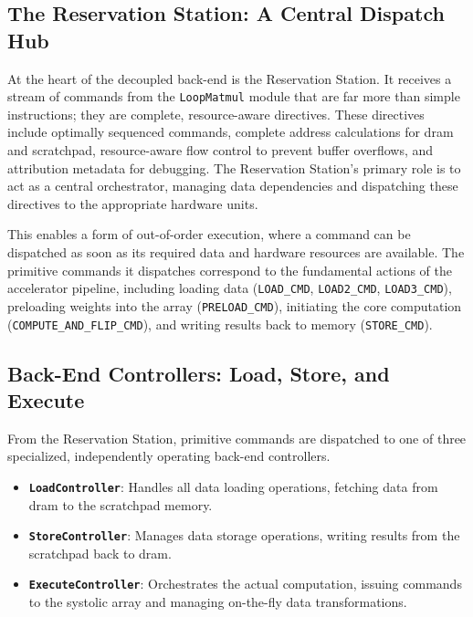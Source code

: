 \subsection{The Reservation Station: A Central Dispatch Hub}
\label{ssec:reservation_station}

At the heart of the decoupled back-end is the Reservation Station. It receives a stream of commands from the \texttt{LoopMatmul} module that are far more than simple instructions; they are complete, resource-aware directives. These directives include optimally sequenced commands, complete address calculations for \acrshort{dram} and scratchpad, resource-aware flow control to prevent buffer overflows, and attribution metadata for debugging. The Reservation Station's primary role is to act as a central orchestrator, managing data dependencies and dispatching these directives to the appropriate hardware units.

This enables a form of out-of-order execution, where a command can be dispatched as soon as its required data and hardware resources are available. The primitive commands it dispatches correspond to the fundamental actions of the accelerator pipeline, including loading data (\texttt{LOAD\_CMD}, \texttt{LOAD2\_CMD}, \texttt{LOAD3\_CMD}), preloading weights into the array (\texttt{PRELOAD\_CMD}), initiating the core computation (\texttt{COMPUTE\_AND\_FLIP\_CMD}), and writing results back to memory (\texttt{STORE\_CMD}).

\subsection{Back-End Controllers: Load, Store, and Execute}
\label{ssec:backend_controllers}

From the Reservation Station, primitive commands are dispatched to one of three specialized, independently operating back-end controllers. 

\begin{itemize}
    \item \textbf{\texttt{LoadController}}: Handles all data loading operations, fetching data from \acrshort{dram} to the scratchpad memory.
    \item \textbf{\texttt{StoreController}}: Manages data storage operations, writing results from the scratchpad back to \acrshort{dram}.
    \item \textbf{\texttt{ExecuteController}}: Orchestrates the actual computation, issuing commands to the systolic array and managing on-the-fly data transformations.
\end{itemize}

